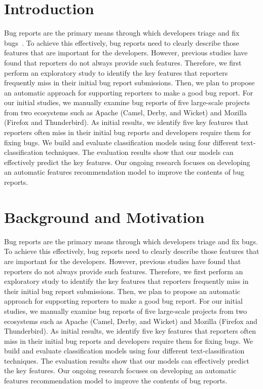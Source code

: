 \documentclass[sigconf,authordraft]{acmart}
\begin{document}
\section{Introduction}
Bug reports are the primary means through which developers triage and fix bugs~\cite{Bettenburg:20082}. To achieve this effectively, bug reports need to clearly describe those features that are important for the developers. However, previous studies have found that reporters do not always provide such features. Therefore, we first perform an exploratory study to identify the key features that reporters frequently miss in their initial bug report submissions. Then, we plan to propose an automatic approach for supporting reporters to make a good bug report. For our initial studies, we manually examine bug reports of five large-scale projects from two ecosystems such as Apache (Camel, Derby, and Wicket) and Mozilla (Firefox and Thunderbird). As initial results, we identify five key features that reporters often miss in their initial bug reports and developers require them for fixing bugs. We build and evaluate classification models using four different text-classification techniques. The evaluation results show that our models can effectively predict the key features. Our ongoing research focuses on developing an automatic features recommendation model to improve the contents of bug reports. 

\section{Background and Motivation}
Bug reports are the primary means through which developers triage and fix bugs. To achieve this effectively, bug reports need to clearly describe those features that are important for the developers. However, previous studies have found that reporters do not always provide such features. Therefore, we first perform an exploratory study to identify the key features that reporters frequently miss in their initial bug report submissions. Then, we plan to propose an automatic approach for supporting reporters to make a good bug report. For our initial studies, we manually examine bug reports of five large-scale projects from two ecosystems such as Apache (Camel, Derby, and Wicket) and Mozilla (Firefox and Thunderbird). As initial results, we identify five key features that reporters often miss in their initial bug reports and developers require them for fixing bugs. We build and evaluate classification models using four different text-classification techniques. The evaluation results show that our models can effectively predict the key features. Our ongoing research focuses on developing an automatic features recommendation model to improve the contents of bug reports. 
\end{document}
